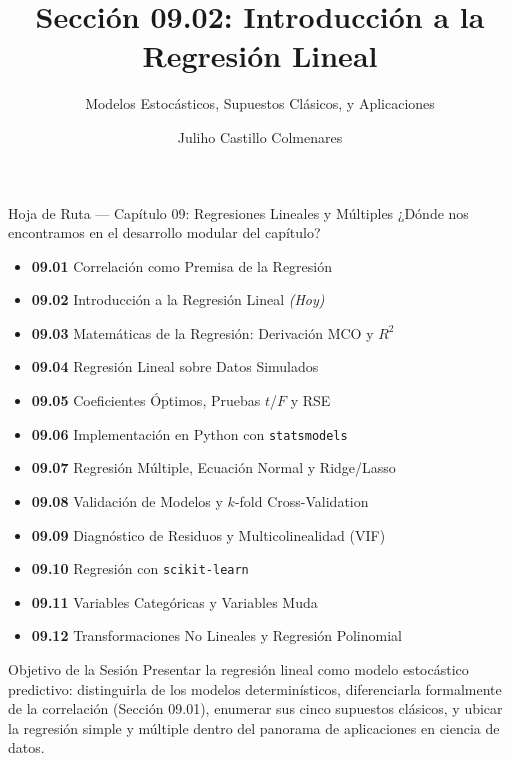 \documentclass[10pt, aspectratio=169]{beamer}
\title[Introducción a la Regresión]{Sección 09.02: Introducción a la Regresión Lineal}
\subtitle{Modelos Estocásticos, Supuestos Clásicos, y Aplicaciones}
\author[J. Castillo Colmenares]{Juliho Castillo Colmenares}
\institute{Tecnológico de Monterrey}
\date{\vspace{-1.2cm}}
\begin{document}
\begin{frame}[plain]
  \vspace{-0.8cm}
  \titlepage
\end{frame}

\begin{frame}{Hoja de Ruta --- Capítulo 09: Regresiones Lineales y Múltiples}
  \scriptsize
  ¿Dónde nos encontramos en el desarrollo modular del capítulo?
  \begin{itemize}\itemsep=0.02em
    \item \textbf{09.01} Correlación como Premisa de la Regresión
    \item \textbf{09.02} Introducción a la Regresión Lineal \emph{(Hoy)}
    \item \textbf{09.03} Matemáticas de la Regresión: Derivación MCO y $R^2$
    \item \textbf{09.04} Regresión Lineal sobre Datos Simulados
    \item \textbf{09.05} Coeficientes Óptimos, Pruebas $t$/$F$ y RSE
    \item \textbf{09.06} Implementación en Python con \texttt{statsmodels}
    \item \textbf{09.07} Regresión Múltiple, Ecuación Normal y Ridge/Lasso
    \item \textbf{09.08} Validación de Modelos y $k$-fold Cross-Validation
    \item \textbf{09.09} Diagnóstico de Residuos y Multicolinealidad (VIF)
    \item \textbf{09.10} Regresión con \texttt{scikit-learn}
    \item \textbf{09.11} Variables Categóricas y Variables Muda
    \item \textbf{09.12} Transformaciones No Lineales y Regresión Polinomial
  \end{itemize}
  \pause
  \vspace{-0.05cm}
  \begin{block}{Objetivo de la Sesión}
    Presentar la regresión lineal como modelo estocástico predictivo: distinguirla de los modelos determinísticos, diferenciarla formalmente de la correlación (Sección 09.01), enumerar sus cinco supuestos clásicos, y ubicar la regresión simple y múltiple dentro del panorama de aplicaciones en ciencia de datos.
  \end{block}
\end{frame}
\end{document}
